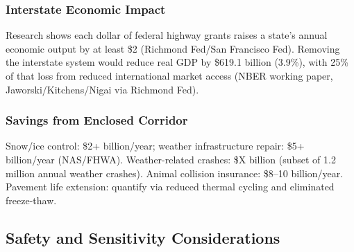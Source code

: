 \documentclass[11pt,letterpaper]{article}
\begin{document}
\subsubsection{Interstate Economic Impact}
Research shows each dollar of federal highway grants raises a state's annual economic output by at least \$2 (Richmond Fed/San Francisco Fed). Removing the interstate system would reduce real GDP by \$619.1 billion (3.9\%), with 25\% of that loss from reduced international market access (NBER working paper, Jaworski/Kitchens/Nigai via Richmond Fed).

\subsubsection{Savings from Enclosed Corridor}
Snow/ice control: \$2+ billion/year; weather infrastructure repair: \$5+ billion/year (NAS/FHWA). Weather-related crashes: \$X billion (subset of 1.2 million annual weather crashes). Animal collision insurance: \$8--10 billion/year. Pavement life extension: quantify via reduced thermal cycling and eliminated freeze-thaw.

\subsection{Safety and Sensitivity Considerations}
\end{document}

